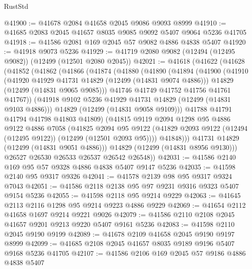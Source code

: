 \begin{lexlean}{RustStd}
\begin{coremodule}
@41900 := @41678 @2084 @41658 @2045 @9086 @9093 @8999
@41910 := @41685 @2083 @2045 @41657 @8035 @9085 @9092 @5407 @9064 @5236 @41705
@41918 := @41586 @2081 @169 @2045 @57 @9082 @4886 @4838 @5407
@41920 := @41918 @9073 @5236
@41929 := @41719 @2080 @9082 (@12494 (@12495 @9082)) (@12499 (@12501 @2080 @2045))
@42021 := @41618
    (@41622
      (@41628
        (@41852
          (@41862
            (@41866
              (@41874
                (@41880
                  (@41890
                    (@41894
                      (@41900
                        (@41910
                          (@41920 @41929 @41731 @14829 (@12499 (@14831 @9074 @4886)))
                          @14829
                          (@12499 (@14831 @9065 @9085)))
                        @41746
                        @41749
                        @41752
                        @41756
                        @41761
                        @41767))
                    (@41918 @9102 @5236 @41929 @41731 @14829 (@12499 (@14831 @9103 @4886)))
                    @14829
                    (@12499 (@14831 @9058 @9109)))
                  @41788
                  @41791
                  @41794
                  @41798
                  @41803
                  @41809)
                (@41815
                  @9119
                  @2094
                  @1298
                  @95
                  @4886
                  @9122
                  @4886
                  @7058
                  (@41825
                    @2094
                    @95
                    @9122
                    (@41829 @2093 @9122 (@12494 (@12495 @9122)) (@12499 (@12501 @2093 @95))))
                  @41848)))
            @41731
            @14829
            (@12499 (@14831 @9051 @4886)))
          @14829
          (@12499 (@14831 @8956 @9130)))
        @26527
        @26530
        @26533
        @26537
        @26542
        @26548))
@42031 := @41586 @2140 @169 @95 @57 @9328 @4886 @4838 @5407 @9147 @5236
@42035 := @41598 @2140 @95 @9317 @9326
@42041 := @41578 @2139 @98 @95 @9317 @9324 @7043
@42051 := @41586 @2118 @2138 @95 @97 @9231 @9316 @9323 @5407 @9154 @5236
@42055 := @41598 @2118 @95 @9214 @9229
@42063 := @41645 @2113 @2116 @1298 @95 @9214 @9223 @4886 @9229
@42069 := @41654 @2112 @41658 @1697 @9214 @9221 @9026
@42079 := @41586 @2110 @2108 @2045 @41657 @9201 @9213 @9220 @5407 @9161 @5236
@42083 := @41598 @2110 @2045 @9190 @9199
@42089 := @41678 @2109 @41658 @2045 @9190 @9197 @8999
@42099 := @41685 @2108 @2045 @41657 @8035 @9189 @9196 @5407 @9168 @5236 @41705
@42107 := @41586 @2106 @169 @2045 @57 @9186 @4886 @4838 @5407

\end{coremodule}
\end{lexlean}
